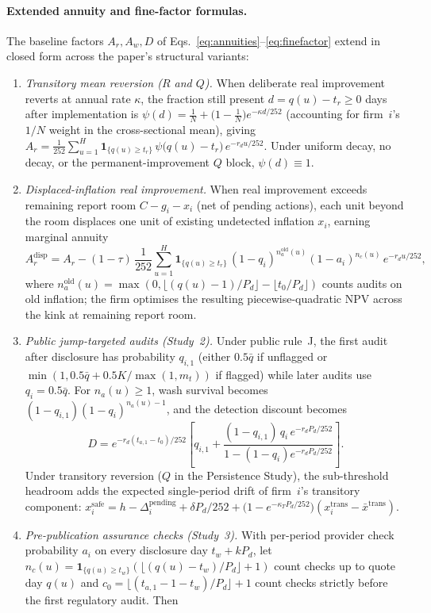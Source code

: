 \documentclass[11pt]{article}
\begin{document}
\paragraph{Extended annuity and fine-factor formulas.}
The baseline factors $A_r, A_w, D$ of Eqs.~\eqref{eq:annuities}--\eqref{eq:finefactor} extend in closed form across the paper's structural variants:
\begin{enumerate}[leftmargin=*]
\item \emph{Transitory mean reversion ($R$ and $Q$).} When deliberate real improvement reverts at annual rate $\kappa$, the fraction still present $d = q(u) - t_r \ge 0$ days after implementation is $\psi(d) = \frac{1}{N} + \big(1 - \frac{1}{N}\big)e^{-\kappa d/252}$ (accounting for firm~$i$'s $1/N$ weight in the cross-sectional mean), giving $A_r = \frac{1}{252}\sum_{u=1}^H \mathbf{1}_{\{q(u)\ge t_r\}}\,\psi\!\big(q(u)-t_r\big)\,e^{-r_d u/252}$. Under uniform decay, no decay, or the permanent-improvement $Q$ block, $\psi(d) \equiv 1$.
\item \emph{Displaced-inflation real improvement.} When real improvement exceeds remaining report room $C - g_i - x_i$ (net of pending actions), each unit beyond the room displaces one unit of existing undetected inflation $x_i$, earning marginal annuity
\[
A_r^{\mathrm{disp}} = A_r - (1 - \tau)\,\frac{1}{252}\sum_{u=1}^H \mathbf{1}_{\{q(u)\ge t_r\}}\,(1 - q_i)^{n_a^{\mathrm{old}}(u)}(1 - a_i)^{n_c(u)}\,e^{-r_d u/252},
\]
where $n_a^{\mathrm{old}}(u) = \max(0, \lfloor (q(u)-1)/P_d \rfloor - \lfloor t_0/P_d \rfloor)$ counts audits on old inflation; the firm optimises the resulting piecewise-quadratic NPV across the kink at remaining report room.
\item \emph{Public jump-targeted audits (Study~2).} Under public rule~J, the first audit after disclosure has probability $q_{i,1}$ (either $0.5\bar q$ if unflagged or $\min(1, 0.5\bar q + 0.5K/\max(1, m_t))$ if flagged) while later audits use $q_i = 0.5\bar q$. For $n_a(u) \ge 1$, wash survival becomes $(1 - q_{i,1})(1 - q_i)^{n_a(u)-1}$, and the detection discount becomes
\[
D = e^{-r_d(t_{a,1}-t_0)/252}\left[q_{i,1} + \frac{(1 - q_{i,1})\,q_i\,e^{-r_d P_d/252}}{1 - (1 - q_i)e^{-r_d P_d/252}}\right].
\]
Under transitory reversion ($Q$ in the Persistence Study), the sub-threshold headroom adds the expected single-period drift of firm~$i$'s transitory component: $x_i^{\mathrm{safe}} = h - \Delta_i^{\mathrm{pending}} + \delta P_d/252 + \big(1 - e^{-\kappa_T P_d/252}\big)(x_i^{\mathrm{trans}} - \bar x^{\mathrm{trans}})$.
\item \emph{Pre-publication assurance checks (Study~3).} With per-period provider check probability $a_i$ on every disclosure day $t_w + k P_d$, let $n_c(u) = \mathbf{1}_{\{q(u)\ge t_w\}}(\lfloor (q(u)-t_w)/P_d \rfloor + 1)$ count checks up to quote day $q(u)$ and $c_0 = \lfloor (t_{a,1} - 1 - t_w)/P_d \rfloor + 1$ count checks strictly before the first regulatory audit. Then

\end{enumerate}
\end{document}
